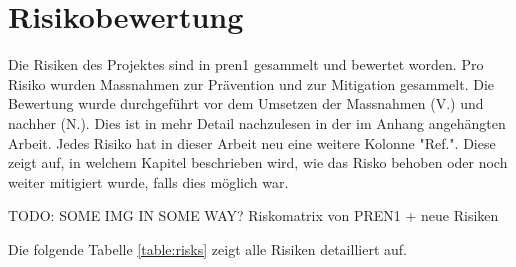\section{Risikobewertung}


Die Risiken des Projektes sind in \acrshort{pren1} gesammelt und bewertet worden. Pro Risiko wurden Massnahmen zur Prävention und zur Mitigation gesammelt. Die Bewertung wurde durchgeführt vor dem Umsetzen der Massnahmen (V.) und nachher (N.). Dies ist in mehr Detail nachzulesen in der im Anhang angehängten Arbeit. Jedes Risiko hat in dieser Arbeit neu eine weitere Kolonne "Ref.". Diese zeigt auf, in welchem Kapitel beschrieben wird, wie das Risko behoben oder noch weiter mitigiert wurde, falls dies möglich war.

TODO: SOME IMG IN SOME WAY? Riskomatrix von PREN1 + neue Risiken



Die folgende Tabelle \ref{table:risks} zeigt alle Risiken detailliert auf.

